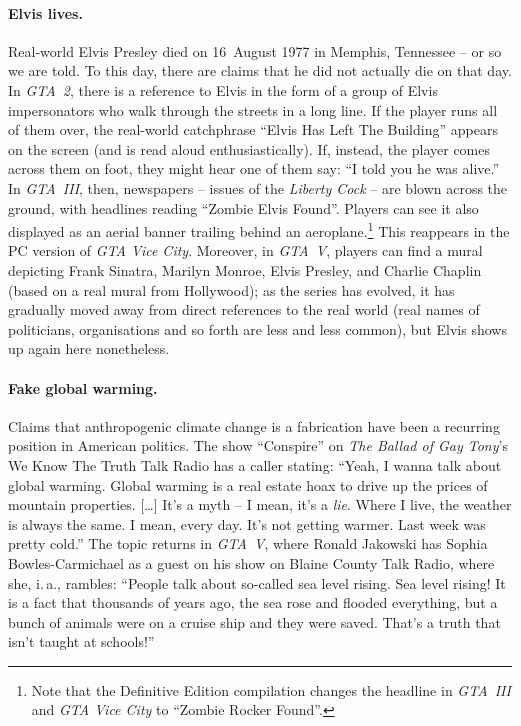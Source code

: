 \documentclass[]{scrartcl}
\begin{document}
\paragraph{Elvis lives.}
Real-world Elvis Presley died on 16~August 1977 in Memphis, Tennessee -- or so we are told.
To this day, there are claims that he did not actually die on that day.
In \textit{GTA~2}, there is a reference to Elvis in the form of a group of Elvis impersonators who walk through the streets in a long line.
If the player runs all of them over, the real-world catchphrase \enquote{Elvis Has Left The Building} appears on the screen (and is read aloud enthusiastically).
If, instead, the player comes across them on foot, they might hear one of them say: \enquote{I told you he was alive.}
In \textit{GTA~III}, then, newspapers -- issues of the \textit{Liberty Cock} -- are blown across the ground, with headlines reading \enquote{Zombie Elvis Found}.
Players can see it also displayed as an aerial banner trailing behind an aeroplane.\footnote{Note that the Definitive Edition compilation changes the headline in \textit{GTA~III} and \textit{GTA Vice City} to \enquote{Zombie Rocker Found}.}
This reappears in the PC version of \textit{GTA Vice City}.
Moreover, in \textit{GTA~V}, players can find a mural depicting Frank Sinatra, Marilyn Monroe, Elvis Presley, and Charlie Chaplin (based on a real mural from Hollywood); as the series has evolved, it has gradually moved away from direct references to the real world (real names of politicians, organisations and so forth are less and less common), but Elvis shows up again here nonetheless.

\paragraph{Fake global warming.}
Claims that anthropogenic climate change is a fabrication have been a recurring position in American politics.
The show \enquote{Conspire} on \textit{The Ballad of Gay Tony}'s We Know The Truth Talk Radio has a caller stating:
\enquote{Yeah, I wanna talk about global warming.
Global warming is a real estate hoax to drive up the prices of mountain properties. [\dots]
It's a myth -- I mean, it's a \textit{lie}.
Where I live, the weather is always the same.
I mean, every day.
It's not getting warmer.
Last week was pretty cold.}
The topic returns in \textit{GTA~V}, where Ronald Jakowski has Sophia Bowles-Carmichael as a guest on his show on Blaine County Talk Radio, where she, i.\,a., rambles:
\enquote{People talk about so-called sea level rising.
Sea level rising!
It is a fact that thousands of years ago, the sea rose and flooded everything, but a bunch of animals were on a cruise ship and they were saved.
That's a truth that isn't taught at schools!}
\end{document}
